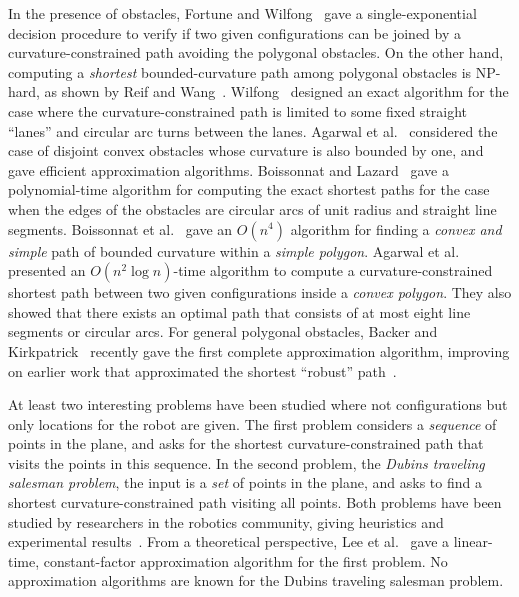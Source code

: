 \documentclass[a4paper]{article}
\begin{document}
In the presence of obstacles, Fortune and Wilfong~\cite{fw-pcm-91}
gave a single-exponential decision procedure to verify if two given
configurations can be joined by a curvature-constrained path avoiding
the polygonal obstacles.  On the other hand, computing a
\emph{shortest} bounded-curvature path among polygonal obstacles is
NP-hard, as shown by Reif and Wang~\cite{rw-ctdcc-98}.
Wilfong~\cite{w-mpav-88} designed an exact algorithm for the case
where the curvature-constrained path is limited to some fixed straight
``lanes'' and circular arc turns between the lanes.  Agarwal et
al.~\cite{art-mpscr-95} considered the case of disjoint convex
obstacles whose curvature is also bounded by one, and gave efficient
approximation algorithms. Boissonnat and Lazard~\cite{bl-ptacs-03}
gave a polynomial-time algorithm for computing the exact shortest
paths for the case when the edges of the obstacles are circular arcs
of unit radius and straight line segments. Boissonnat et
al.~\cite{bgkl-accsp-02} gave an $O(n^4)$ algorithm for finding a
\emph{convex and simple} path of bounded curvature within a
\emph{simple polygon}.  Agarwal et al.~\cite{ablrsw-ccspc-02}
presented an $O(n^2\log n)$-time algorithm to compute a
curvature-constrained shortest path between two given configurations
inside a \emph{convex polygon}.  They also showed that there exists an
optimal path that consists of at most eight line segments or circular
arcs.  For general polygonal obstacles, Backer and
Kirkpatrick~\cite{bk-caasb-08} recently gave the first complete
approximation algorithm, improving on earlier work that approximated
the shortest ``robust'' path~\cite{jc-pspmr-92,aw-aaccs-01}.

At least two interesting problems have been studied where not
configurations but only locations for the robot are given.  The first
problem considers a \emph{sequence} of points in the plane, and asks
for the shortest curvature-constrained path that visits the points in
this sequence.  In the second problem, the \emph{Dubins traveling
  salesman problem}, the input is a \emph{set} of points in the plane,
and asks to find a shortest curvature-constrained path visiting all
points.  Both problems have been studied by researchers in the
robotics community, giving heuristics and experimental
results~\cite{sfb-opptspdv-05,mc-rhpdtsp-06,leny_07}. From a
theoretical perspective, Lee et al.~\cite{lcksc-accsp-00} gave a
linear-time, constant-factor approximation algorithm for the first
problem.  No approximation algorithms are known for the Dubins
traveling salesman problem.
\end{document}
